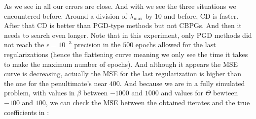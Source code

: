 \documentclass[a4]{article}
\begin{document}
As we see in  all our errors are close. And with  we see the three situations we encountered before. Around a division of $\lambda_{\max}$ by $10$ and before, CD is faster.
After that CD is better than PGD-type methods but not CBPGs. And then it needs to search even longer. Note that in this experiment, only PGD methods did not reach the $\epsilon=10^{-3}$ precision in the $500$ epochs allowed for the last regularizations (hence the flattening curve meaning we only see the time it takes to make the maximum number of epochs).
And although it appears the MSE curve is decreasing, actually the MSE for the last regularization is higher than the one for the penultimate's near $400$.
And because we are in a fully simulated problem, with values in $\beta$ between $-1000$ and $1000$ and values for $\Theta$ bewteen $-100$ and $100$, we can check the MSE between the obtained iterates and the true coefficients in :
\end{document}
